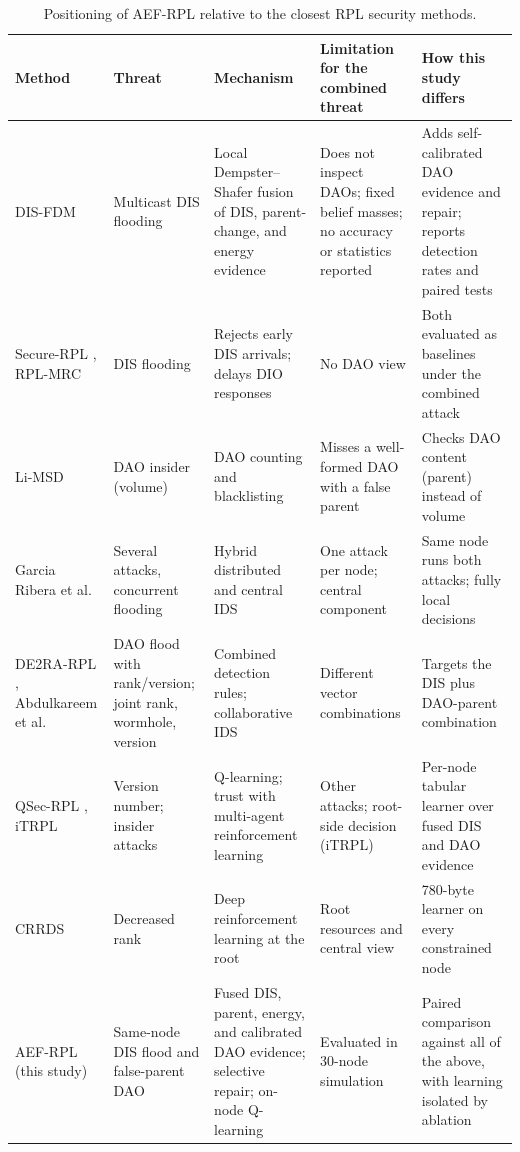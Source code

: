 \begin{table}[t]
\caption{Positioning of AEF-RPL relative to the closest RPL security methods.}\label{tab:positioning}
\centering\footnotesize
\setlength{\tabcolsep}{4pt}
\renewcommand{\arraystretch}{1.0}
\begin{tabularx}{\textwidth}{@{}p{}p{}p{}p{}X@{}}
\toprule
Method & Threat & Mechanism & Limitation for the combined threat & How this study differs \\
\midrule
DIS-FDM \cite{prajisha2025} & Multicast DIS flooding & Local Dempster--Shafer fusion of DIS, parent-change, and energy evidence & Does not inspect DAOs; fixed belief masses; no accuracy or statistics reported & Adds self-calibrated DAO evidence and repair; reports detection rates and paired tests \\
Secure-RPL \cite{vermaranga2020}, RPL-MRC \cite{medjek2021} & DIS flooding & Rejects early DIS arrivals; delays DIO responses & No DAO view & Both evaluated as baselines under the combined attack \\
Li-MSD \cite{limsd2024} & DAO insider (volume) & DAO counting and blacklisting & Misses a well-formed DAO with a false parent & Checks DAO content (parent) instead of volume \\
Garcia Ribera et al.\ \cite{garciaribera2022} & Several attacks, concurrent flooding & Hybrid distributed and central IDS & One attack per node; central component & Same node runs both attacks; fully local decisions \\
DE2RA-RPL \cite{de2rarpl2024}, Abdulkareem et al.\ \cite{abdulkareem2024} & DAO flood with rank/version; joint rank, wormhole, version & Combined detection rules; collaborative IDS & Different vector combinations & Targets the DIS plus DAO-parent combination \\
QSec-RPL \cite{qsecrpl2023}, iTRPL \cite{itrpl2024} & Version number; insider attacks & Q-learning; trust with multi-agent reinforcement learning & Other attacks; root-side decision (iTRPL) & Per-node tabular learner over fused DIS and DAO evidence \\
CRRDS \cite{haqdad2026} & Decreased rank & Deep reinforcement learning at the root & Root resources and central view & 780-byte learner on every constrained node \\
\midrule
AEF-RPL (this study) & Same-node DIS flood and false-parent DAO & Fused DIS, parent, energy, and calibrated DAO evidence; selective repair; on-node Q-learning & Evaluated in 30-node simulation & Paired comparison against all of the above, with learning isolated by ablation \\
\bottomrule
\end{tabularx}
\end{table}

